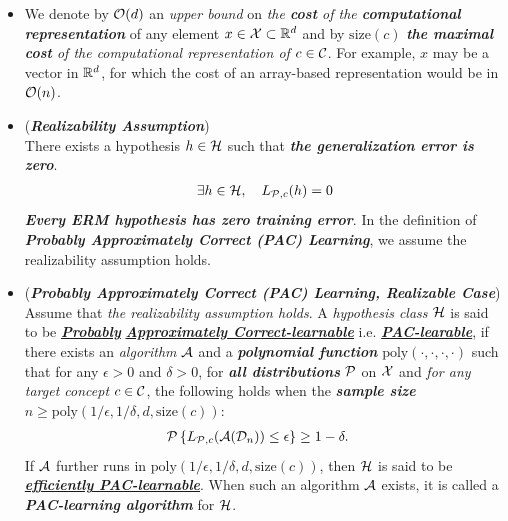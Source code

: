 \documentclass[11pt]{article}
\begin{document}
\begin{itemize}
\item  \begin{remark}
We denote by ${\mathcal O}(d)$ an \emph{upper bound} on \emph{the \textbf{cost} of the \textbf{computational representation}} of any element $x \in {\mathcal X} \subset {\mathbb R}^d$ and by $\text{size}(c)$ \emph{\textbf{the maximal cost} of the computational representation of $c \in {\mathcal C}$}. For example, $x$ may be a vector in ${\mathbb R}^d$,
for which the cost of an array-based representation would be in ${\mathcal O}(n)$.
\end{remark}

\item \begin{remark}(\textbf{\emph{Realizability Assumption}})\\
There exists a hypothesis $h \in {\mathcal H}$ such that \emph{\textbf{the generalization error is zero}}.
\begin{align*}
\exists h\in {\mathcal H}, \quad  L_{{\mathcal P}, c}(h) = 0
\end{align*} \emph{\textbf{Every ERM hypothesis has zero training error}}. In the definition of \emph{\textbf{Probably Approximately Correct (PAC) Learning}}, we assume the realizability assumption holds.
\end{remark}

\item 
\begin{definition} (\emph{\textbf{Probably Approximately Correct (PAC) Learning, Realizable Case}})\\
Assume that \emph{the realizability assumption holds}. A \emph{hypothesis class} ${\mathcal H}$  is said to be \underline{\emph{\textbf{Probably}}} \underline{\emph{\textbf{Approximately Correct-learnable}}} i.e. \underline{\emph{\textbf{PAC-learable}}},  if there exists an \emph{algorithm} ${\mathcal A}$ and a \emph{\textbf{polynomial function}} $\text{poly}(\cdot, \cdot, \cdot, \cdot)$  such that for any $\epsilon > 0$ and $\delta > 0$, for \emph{\textbf{all distributions}} ${\mathcal P}$ on ${\mathcal X}$ and \emph{for any target concept} $c \in {\mathcal C}$, %
 the following holds when the \emph{\textbf{sample size}} $n \ge \text{poly}(1/\epsilon, 1/\delta, d, \text{size}(c)):$
\begin{align}
{\mathcal P}\left\{L_{{\mathcal P}, c}({\mathcal A}({\mathcal D}_n))  \le \epsilon\right\} &\ge  1 - \delta.  \label{eqn: pac_definition}
\end{align}
If ${\mathcal A}$ further runs in $\text{poly}(1/\epsilon, 1/\delta, d, \text{size}(c))$, then ${\mathcal H}$ is said to be \underline{\emph{\textbf{efficiently PAC-learnable}}}. When such an algorithm ${\mathcal A}$ exists, it is called a \emph{\textbf{PAC-learning algorithm}} for ${\mathcal H}$.
\end{definition}


\end{itemize}
\end{document}
